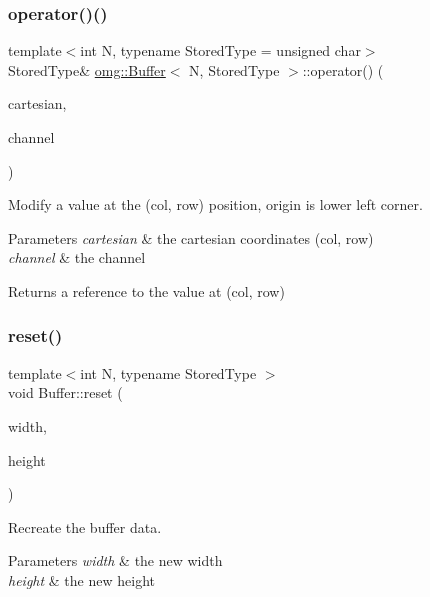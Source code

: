 \subsubsection{\texorpdfstring{operator()()}{operator()()}\hspace{0.1cm}{\footnotesize\ttfamily [4/4]}}
{\footnotesize\ttfamily template$<$int N, typename Stored\+Type = unsigned char$>$ \\
Stored\+Type\& \mbox{\hyperlink{classomg_1_1_buffer}{omg\+::\+Buffer}}$<$ N, Stored\+Type $>$\+::operator() (\begin{DoxyParamCaption}\item[{const Cartesian \&}]{cartesian,  }\item[{int}]{channel }\end{DoxyParamCaption})}



Modify a value at the (col, row) position, origin is lower left corner. 


\begin{DoxyParams}{Parameters}
{\em cartesian} & the cartesian coordinates (col, row) \\
\hline
{\em channel} & the channel \\
\hline
\end{DoxyParams}
\begin{DoxyReturn}{Returns}
a reference to the value at (col, row) 
\end{DoxyReturn}
\mbox{\label{classomg_1_1_buffer_a674041ad7b285bf2418b75b7653ded36}} 
\subsubsection{\texorpdfstring{reset()}{reset()}}
{\footnotesize\ttfamily template$<$int N, typename Stored\+Type $>$ \\
void Buffer\+::reset (\begin{DoxyParamCaption}\item[{int}]{width,  }\item[{int}]{height }\end{DoxyParamCaption})}



Recreate the buffer data. 


\begin{DoxyParams}{Parameters}
{\em width} & the new width \\
\hline
{\em height} & the new height \\
\hline
\end{DoxyParams}
\mbox{\label{classomg_1_1_buffer_a8b3d3ee363be87e1051a157a2f3abed6}} 
